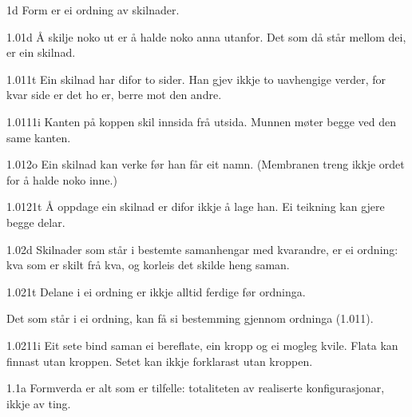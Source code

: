 \begin{formproposition}{1}{d}
Form er ei ordning av skilnader.
\end{formproposition}

\begin{formproposition}{1.01}{d}
Å skilje noko ut er å halde noko anna utanfor. Det som då står mellom dei, er ein skilnad.
\end{formproposition}

\begin{formproposition}{1.011}{t}
Ein skilnad har difor to sider. Han gjev ikkje to uavhengige verder, for kvar side er det ho er, berre mot den andre.
\end{formproposition}

\begin{formproposition}{1.0111}{i}
Kanten på koppen skil innsida frå utsida. Munnen møter begge ved den same kanten.
\end{formproposition}

\begin{formproposition}{1.012}{o}
Ein skilnad kan verke før han får eit namn. (Membranen treng ikkje ordet for å halde noko inne.)
\end{formproposition}

\begin{formproposition}{1.0121}{t}
Å oppdage ein skilnad er difor ikkje å lage han. Ei teikning kan gjere begge delar.
\end{formproposition}

\begin{formproposition}{1.02}{d}
Skilnader som står i bestemte samanhengar med kvarandre, er ei ordning: kva som er skilt frå kva, og korleis det skilde heng saman.
\end{formproposition}

\begin{formproposition}{1.021}{t}
Delane i ei ordning er ikkje alltid ferdige før ordninga.

Det som står i ei ordning, kan få si bestemming gjennom ordninga (1.011).
\end{formproposition}

\begin{formproposition}{1.0211}{i}
Eit sete bind saman ei bereflate, ein kropp og ei mogleg kvile. Flata kan finnast utan kroppen. Setet kan ikkje forklarast utan kroppen.
\end{formproposition}

\begin{formproposition}{1.1}{a}
Formverda er alt som er tilfelle: totaliteten av realiserte konfigurasjonar, ikkje av ting.
\end{formproposition}

